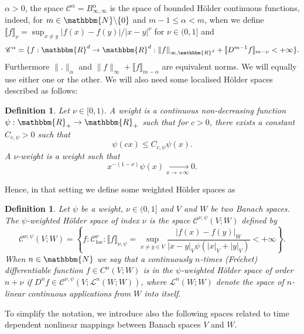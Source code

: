\documentclass[a4paper,11pt]{article}
\newcommand{\tmop}[1]{\ensuremath{\operatorname{#1}}}
\newtheorem{definition}[theorem]{Definition}
\newcommand{\CC}{\mathscr C}
\begin{document}
$\alpha >0$, the space $\CC^{\alpha} =B^{\alpha}_{\infty , \infty}$ is the
space of bounded Hölder continuous functions, indeed, for $m \in
\mathbbm{N}\backslash \{ 0 \}$ and $m-1 \leqslant \alpha <m$, when we define
$\llbracket f \rrbracket_{\nu} = \sup_{x \neq y} | f ( x ) -f ( y ) | / | x-y
|^{\nu}$ for $\nu \in ( 0,1 ]$ and
\[ \CC^{\alpha} = \{ f:\mathbbm{R}^{d} \rightarrow \mathbbm{R}^{d} : \| f
   \|_{\infty ,\mathbbm{R}^{d}} + \llbracket D^{m-1} f \rrbracket_{m- \nu} <+
   \infty \} . \]
Furthermore $\| . \|_{\alpha}$ and $\| f \|_{\infty} + \llbracket f
\rrbracket_{m- \alpha}$ are equivalent norms. We will equally use either
one or the other. We will also need some localised Hölder spaces described as
follows:

\begin{definition}
  \label{definition:nu_weight}Let $\nu \in [ 0,1 )$. A weight is a continuous
  non-decreasing function $\psi :\mathbbm{R}_{+} \rightarrow \mathbbm{R}_{+}$
  such that for $c>0$, there exists a constant $C_{c, \psi} >0$ such that
  \[ \psi ( c x ) \leqslant C_{c, \psi} \psi ( x ) . \]
  A $\nu$-weight is a weight such that
  \[ x^{- ( 1- \nu )} \psi ( x ) \xrightarrow[x \rightarrow + \infty]{} 0. \]
\end{definition}

Hence, in that setting we define some weighted Hölder spaces as

\begin{definition}\label{def:weighted_holder}
  Let $\psi$ be a weight, $\nu \in ( 0,1 ]$ and $V$ and $W$ be two Banach spaces.
  The $\psi$-weighted Hölder space of index $\nu$ is the space $\CC^{\nu ,
  \psi} ( V;W )$ defined by
  \[ \CC^{\nu , \psi} ( V;W ) = \left\{ f: \CC^{\nu}_{\tmop{loc}} : \llbracket
     f \rrbracket_{\nu , \psi} = \sup_{x \neq y \in V} \frac{| f ( x ) -f ( y
     ) |_{W}}{| x-y |_{V} \psi ( | x |_{V} + | y |_{V} )} <+ \infty \right\}.
  \]
  When $n\in \mathbbm{N}$ we say that a continuously $n$-times  (Fréchet) differentiable function $f\in C^n(V;W)$ is in the $\psi$-weighted Hölder space of order $n+\nu$ if  $D^n f \in \CC^{\nu,\psi}(V; \mathcal{L}^n(W;W))$, where $\mathcal{L}^n(W;W)$ denote the space of $n$-linear continuous applications from $W$ into itself.
\end{definition}

To simplify the notation, we introduce also the following spaces related to
time dependent nonlinear mappings between Banach spaces $V$ and $W$.
\end{document}
